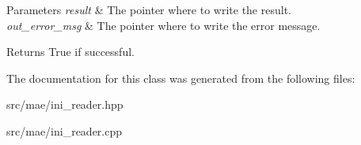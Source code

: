 \begin{DoxyParams}{Parameters}
{\em result} & The pointer where to write the result. \\
\hline
{\em out\-\_\-error\-\_\-msg} & The pointer where to write the error message. \\
\hline
\end{DoxyParams}
\begin{DoxyReturn}{Returns}
True if successful. 
\end{DoxyReturn}


The documentation for this class was generated from the following files\-:\begin{DoxyCompactItemize}
\item 
src/mae/ini\-\_\-reader.\-hpp\item 
src/mae/ini\-\_\-reader.\-cpp\end{DoxyCompactItemize}
